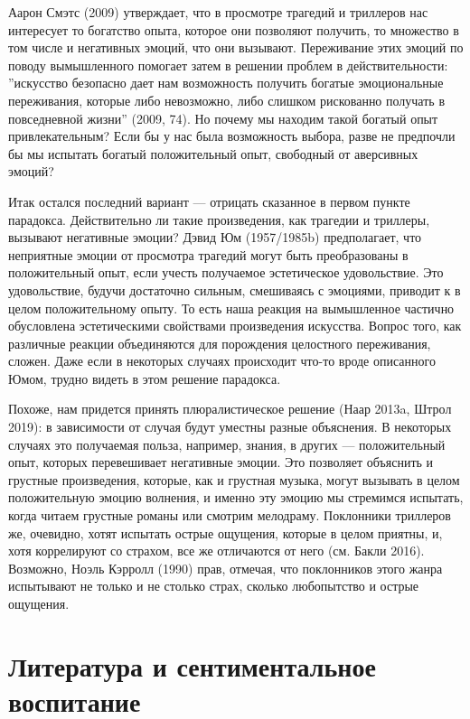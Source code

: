\documentclass[11pt]{book}
\begin{document}
Аарон Смэтс (2009) утверждает, что в просмотре трагедий и триллеров нас интересует то богатство опыта, которое они позволяют получить, то множество в том числе и негативных эмоций, что они вызывают. Переживание этих эмоций по поводу вымышленного помогает затем в решении проблем в действительности: ''искусство безопасно дает нам возможность получить богатые эмоциональные переживания, которые либо невозможно, либо слишком рискованно получать в повседневной жизни'' (2009, 74). Но почему мы находим такой богатый опыт привлекательным? Если бы у нас была возможность выбора, разве не предпочли бы мы испытать богатый положительный опыт, свободный от аверсивных эмоций?

Итак остался последний вариант --- отрицать сказанное в первом пункте парадокса. Действительно ли такие произведения, как трагедии и триллеры, вызывают негативные эмоции? Дэвид Юм (1957/1985b) предполагает, что неприятные эмоции от просмотра трагедий могут быть преобразованы в положительный опыт, если учесть получаемое эстетическое удовольствие. Это удовольствие, будучи достаточно сильным, смешиваясь с эмоциями, приводит к в целом положительному опыту. То есть наша реакция на вымышленное частично обусловлена эстетическими свойствами произведения искусства. Вопрос того, как различные реакции объединяются для порождения целостного переживания, сложен. Даже если в некоторых случаях происходит что-то вроде описанного Юмом, трудно видеть в этом решение парадокса.

Похоже, нам придется принять плюралистическое решение (Наар 2013a, Штрол 2019): в зависимости от случая будут уместны разные объяснения. В некоторых случаях это получаемая польза, например, знания, в других --- положительный опыт, которых перевешивает негативные эмоции. Это позволяет объяснить и грустные произведения, которые, как и грустная музыка, могут вызывать в целом положительную эмоцию волнения, и именно эту эмоцию мы стремимся испытать, когда читаем грустные романы или смотрим мелодраму. Поклонники триллеров же, очевидно, хотят испытать острые ощущения, которые в целом приятны, и, хотя коррелируют со страхом, все же отличаются от него (см. Бакли 2016). Возможно, Ноэль Кэрролл (1990) прав, отмечая, что поклонников этого жанра испытывают не только и не столько страх, сколько любопытство и острые ощущения.

\section{Литература и сентиментальное воспитание}
\end{document}
